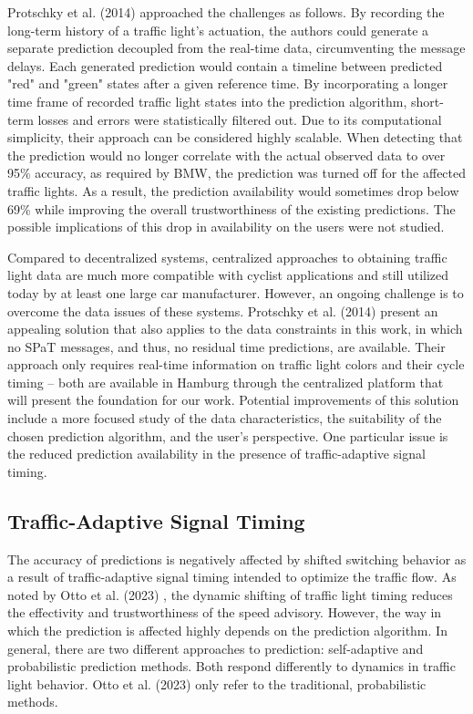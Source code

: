 Protschky et al. (2014) \cite{protschky_extensive_2014, protschky_adaptive_2014} approached the challenges as follows. By recording the long-term history of a traffic light's actuation, the authors could generate a separate prediction decoupled from the real-time data, circumventing the message delays. Each generated prediction would contain a timeline between predicted "red" and "green" states after a given reference time. By incorporating a longer time frame of recorded traffic light states into the prediction algorithm, short-term losses and errors were statistically filtered out. Due to its computational simplicity, their approach can be considered highly scalable. When detecting that the prediction would no longer correlate with the actual observed data to over 95\% accuracy, as required by BMW, the prediction was turned off for the affected traffic lights. As a result, the prediction availability would sometimes drop below 69\% while improving the overall trustworthiness of the existing predictions. The possible implications of this drop in availability on the users were not studied.

Compared to decentralized systems, centralized approaches to obtaining traffic light data are much more compatible with cyclist applications and still utilized today by at least one large car manufacturer. However, an ongoing challenge is to overcome the data issues of these systems. Protschky et al. (2014) \cite{protschky_extensive_2014, protschky_adaptive_2014} present an appealing solution that also applies to the data constraints in this work, in which no SPaT messages, and thus, no residual time predictions, are available. Their approach only requires real-time information on traffic light colors and their cycle timing -- both are available in Hamburg through the centralized platform that will present the foundation for our work. Potential improvements of this solution include a more focused study of the data characteristics, the suitability of the chosen prediction algorithm, and the user's perspective. One particular issue is the reduced prediction availability in the presence of traffic-adaptive signal timing.

\subsection{Traffic-Adaptive Signal Timing}

The accuracy of predictions is negatively affected by shifted switching behavior as a result of traffic-adaptive signal timing intended to optimize the traffic flow. As noted by Otto et al. (2023) \cite{otto_framework_2023}, the dynamic shifting of traffic light timing reduces the effectivity and trustworthiness of the speed advisory. However, the way in which the prediction is affected highly depends on the prediction algorithm. In general, there are two different approaches to prediction: self-adaptive and probabilistic prediction methods. Both respond differently to dynamics in traffic light behavior. Otto et al. (2023) \cite{otto_framework_2023} only refer to the traditional, probabilistic methods.

